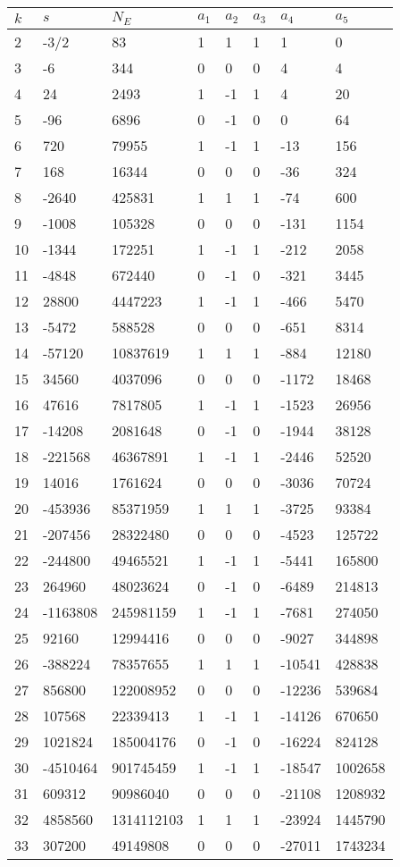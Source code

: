 \documentclass{amsart}
\begin{document}
\begin{longtable}{|l|l|l|lllll|}
\hline
$k$ & $s$ & $N_E$ & $a_1$ & $a_2$ & $a_3$ & $a_4$ & $a_5$\\
\hline
2&-3/2&83&1&1&1&1&0\\
3&-6&344&0&0&0&4&4\\
4&24&2493&1&-1&1&4&20\\
5&-96&6896&0&-1&0&0&64\\
6&720&79955&1&-1&1&-13&156\\
7&168&16344&0&0&0&-36&324\\
8&-2640&425831&1&1&1&-74&600\\
9&-1008&105328&0&0&0&-131&1154\\
10&-1344&172251&1&-1&1&-212&2058\\
11&-4848&672440&0&-1&0&-321&3445\\
12&28800&4447223&1&-1&1&-466&5470\\
13&-5472&588528&0&0&0&-651&8314\\
14&-57120&10837619&1&1&1&-884&12180\\
15&34560&4037096&0&0&0&-1172&18468\\
16&47616&7817805&1&-1&1&-1523&26956\\
17&-14208&2081648&0&-1&0&-1944&38128\\
18&-221568&46367891&1&-1&1&-2446&52520\\
19&14016&1761624&0&0&0&-3036&70724\\
20&-453936&85371959&1&1&1&-3725&93384\\
21&-207456&28322480&0&0&0&-4523&125722\\
22&-244800&49465521&1&-1&1&-5441&165800\\
23&264960&48023624&0&-1&0&-6489&214813\\
24&-1163808&245981159&1&-1&1&-7681&274050\\
25&92160&12994416&0&0&0&-9027&344898\\
26&-388224&78357655&1&1&1&-10541&428838\\
27&856800&122008952&0&0&0&-12236&539684\\
28&107568&22339413&1&-1&1&-14126&670650\\
29&1021824&185004176&0&-1&0&-16224&824128\\
30&-4510464&901745459&1&-1&1&-18547&1002658\\
31&609312&90986040&0&0&0&-21108&1208932\\
32&4858560&1314112103&1&1&1&-23924&1445790\\
33&307200&49149808&0&0&0&-27011&1743234\\

\end{longtable}
\end{document}
